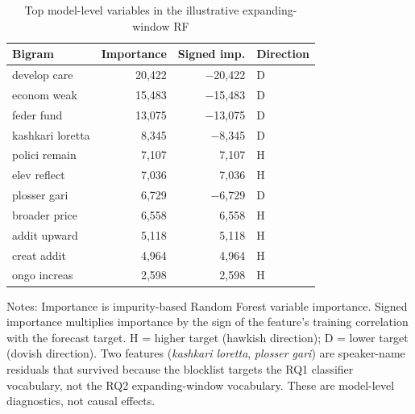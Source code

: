 \begin{table}[H]
\centering
\caption{Top model-level variables in the illustrative expanding-window RF}
\label{tab:rf_single_xw_importance}
\begin{threeparttable}
\small
\begin{tabular}{lrrl}
\toprule
Bigram & Importance & Signed imp. & Direction \\
\midrule
develop care      & 20{,}422 & $-$20{,}422 & D \\
econom weak       & 15{,}483 & $-$15{,}483 & D \\
feder fund        & 13{,}075 & $-$13{,}075 & D \\
kashkari loretta  &  8{,}345 & $-$8{,}345  & D \\
polici remain     &  7{,}107 &     7{,}107  & H \\
elev reflect      &  7{,}036 &     7{,}036  & H \\
plosser gari      &  6{,}729 & $-$6{,}729  & D \\
broader price     &  6{,}558 &     6{,}558  & H \\
addit upward      &  5{,}118 &     5{,}118  & H \\
creat addit       &  4{,}964 &     4{,}964  & H \\
ongo increas      &  2{,}598 &     2{,}598  & H \\
\bottomrule
\end{tabular}
\begin{tablenotes}[flushleft]
\footnotesize
\item Notes: Importance is impurity-based Random Forest variable importance.
Signed importance multiplies importance by the sign of the feature's training
correlation with the forecast target. H = higher target (hawkish direction);
D = lower target (dovish direction). Two features (\emph{kashkari loretta},
\emph{plosser gari}) are speaker-name residuals that survived because the
blocklist targets the RQ1 classifier vocabulary, not the RQ2 expanding-window
vocabulary. These are model-level diagnostics, not causal effects.
\end{tablenotes}
\end{threeparttable}
\end{table}

